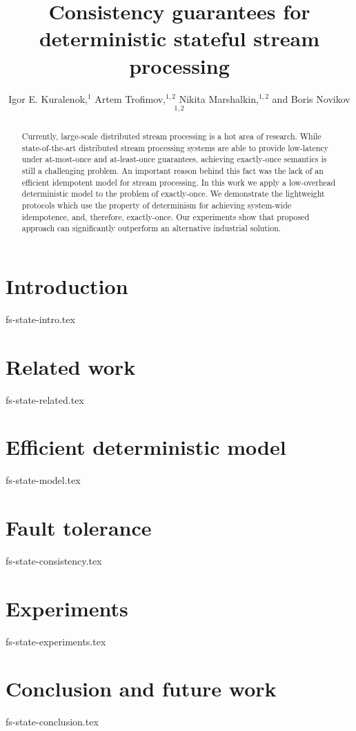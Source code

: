 \documentclass[sigconf]{acmart}
\theoremstyle{remark}
\begin{document}
\title {Consistency guarantees for deterministic stateful stream processing}

\author{  Igor E. Kuralenok,$^1$     Artem Trofimov,$^ {1,2}$    Nikita Marshalkin,$^ {1,2}$   and  Boris Novikov$^ {1,2}$ }

\begin{abstract}
Currently, large-scale distributed stream processing is a hot area of research. While state-of-the-art distributed stream processing systems are able to provide low-latency under at-most-once and at-least-once guarantees, achieving exactly-once semantics is still a challenging problem. An important reason behind this fact was the lack of an efficient idempotent model for stream processing. In this work we apply a low-overhead deterministic model to the problem of exactly-once. We demonstrate the lightweight protocols which use the property of determinism for achieving system-wide idempotence, and, therefore, exactly-once. Our experiments show that proposed approach can significantly outperform an alternative industrial solution.
\end{abstract}

\maketitle

\section {Introduction}
 {fs-state-intro.tex}

\section {Related work}
 {fs-state-related.tex}

\section {Efficient deterministic model}
 {fs-state-model.tex}

\section{Fault tolerance}
 {fs-state-consistency.tex}

\section {Experiments}
 {fs-state-experiments.tex}

\section {Conclusion and future work}
 {fs-state-conclusion.tex}



\end{document}
